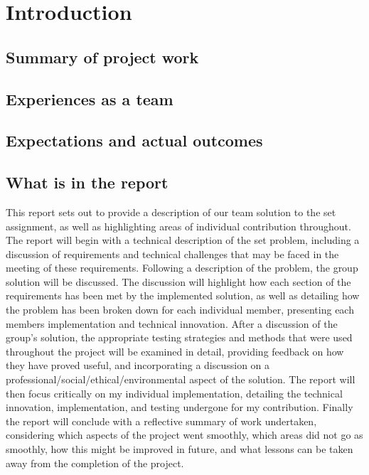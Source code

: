 \documentclass[a4paper]{report}
\begin{document}


\tableofcontents

\chapter*{Introduction} 
\section{Summary of project work}

\section{Experiences as a team}
\section{Expectations and actual outcomes}
\section{What is in the report}
This report sets out to provide a description of our team solution to the set 
assignment, as well as highlighting areas of individual contribution throughout.
The report will begin with a technical description of the set problem, 
including a discussion of requirements and technical challenges that may be 
faced in the meeting of these requirements. 
Following a description of the problem, the group solution will be discussed. 
The discussion will highlight how each section of the requirements has been met 
by the implemented solution, as well as detailing how the problem has been broken 
down for each individual member, presenting each members implementation and 
technical innovation. 
After a discussion of the group's solution, the appropriate testing strategies 
and methods that were used throughout the project will be examined in detail, 
providing feedback on how they have proved useful, and incorporating a 
discussion on a professional/social/ethical/environmental aspect of the solution.
The report will then focus critically on my individual implementation, 
detailing the technical innovation, implementation, and testing undergone for my 
contribution. 
Finally the report will conclude with a reflective summary of work 
undertaken, considering which aspects of the project went smoothly, which areas
did not go as smoothly, how this might be improved in future, and what lessons 
can be taken away from the completion of the project. 
\end{document}
